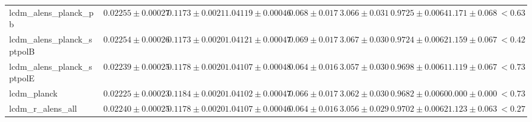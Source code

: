 \documentclass[preprint]{emulateapj}
\begin{document}
\begin{table*}[h]
\begin{center}
\begin{tabular}{l || c c c c c c c | c}
lcdm\_alens\_planck\_pb & $ 0.02255\pm  0.00027$ & $ 0.1173\pm  0.0021$ & $ 1.04119\pm  0.00046$ & $ 0.068\pm  0.017$ & $ 3.066\pm  0.031$ & $ 0.9725\pm  0.0064$ & $ 1.171 \pm  0.068$ & $< 0.63$ \\
lcdm\_alens\_planck\_sptpolB & $ 0.02254\pm  0.00026$ & $ 0.1173\pm  0.0020$ & $ 1.04121\pm  0.00047$ & $ 0.069\pm  0.017$ & $ 3.067\pm  0.030$ & $ 0.9724\pm  0.0062$ & $ 1.159 \pm  0.067$ & $< 0.42$ \\
lcdm\_alens\_planck\_sptpolE & $ 0.02239\pm  0.00025$ & $ 0.1178\pm  0.0020$ & $ 1.04107\pm  0.00048$ & $ 0.064\pm  0.016$ & $ 3.057\pm  0.030$ & $ 0.9698\pm  0.0061$ & $ 1.119 \pm  0.067$ & $< 0.73$ \\
lcdm\_planck & $ 0.02225\pm  0.00023$ & $ 0.1184\pm  0.0020$ & $ 1.04102\pm  0.00047$ & $ 0.066\pm  0.017$ & $ 3.062\pm  0.030$ & $ 0.9682\pm  0.0060$ & $ 0.000 \pm  0.000$ & $< 0.73$ \\
lcdm\_r\_alens\_all & $ 0.02240\pm  0.00025$ & $ 0.1178\pm  0.0020$ & $ 1.04107\pm  0.00046$ & $ 0.064\pm  0.016$ & $ 3.056\pm  0.029$ & $ 0.9702\pm  0.0062$ & $ 1.123 \pm  0.063$ & $< 0.27$ \\
\end{tabular}
 \normalsize
\end{center}
\end{table*}
\end{document}
